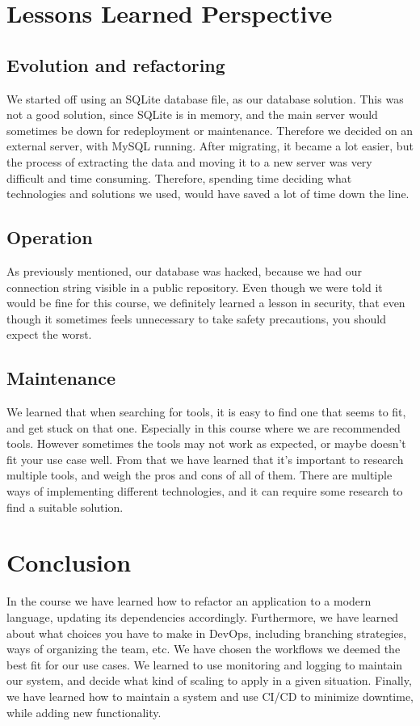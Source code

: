 \documentclass{article}
\begin{document}
\section{Lessons Learned Perspective}
\subsection{Evolution and refactoring}
We started off using an SQLite database file, as our database solution. This was not a good solution, since SQLite is in memory, and the main server would sometimes be down for redeployment or maintenance. Therefore we decided on an external server, with MySQL running. After migrating, it became a lot easier, but the process of extracting the data and moving it to a new server was very difficult and time consuming. Therefore, spending time deciding what technologies and solutions we used, would have saved a lot of time down the line.

\subsection{Operation}
As previously mentioned, our database was hacked, because we had our connection string visible in a public repository. Even though we were told it would be fine for this course, we definitely learned a lesson in security, that even though it sometimes feels unnecessary to take safety precautions, you should expect the worst.

\subsection{Maintenance}
We learned that when searching for tools, it is easy to find one that seems to fit, and get stuck on that one. Especially in this course where we are recommended tools. However sometimes the tools may not work as expected, or maybe doesn't fit your use case well. From that we have learned that it's important to research multiple tools, and weigh the pros and cons of all of them. There are multiple ways of implementing different technologies, and it can require some research to find a suitable solution.

\section{Conclusion}
In the course we have learned how to refactor an application to a modern language, updating its dependencies accordingly. Furthermore, we have learned about what choices you have to make in DevOps, including branching strategies, ways of organizing the team, etc. We have chosen the workflows we deemed the best fit for our use cases. We learned to use monitoring and logging to maintain our system, and decide what kind of scaling to apply in a given situation. Finally, we have learned how to maintain a system and use CI/CD to minimize downtime, while adding new functionality. 

\nocite{*}
\newpage


\end{document}
